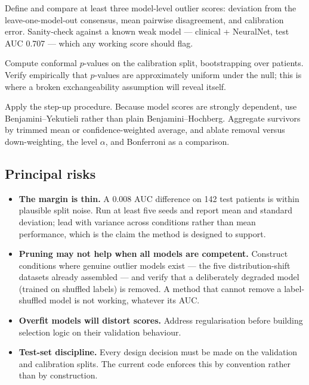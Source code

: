 \documentclass[11pt,a4paper]{article}
\begin{document}
\begin{description}[leftmargin=2.2cm,style=nextline]
  \item[Weeks 5--6] Define and compare at least three model-level outlier
    scores: deviation from the leave-one-model-out consensus, mean pairwise
    disagreement, and calibration error. Sanity-check against a known weak
    model --- clinical + NeuralNet, test AUC 0.707 --- which any working score
    should flag.
  \item[Weeks 6--7] Compute conformal $p$-values on the calibration split,
    bootstrapping over patients. Verify empirically that $p$-values are
    approximately uniform under the null; this is where a broken
    exchangeability assumption will reveal itself.
  \item[Weeks 7--8] Apply the step-up procedure. Because model scores are
    strongly dependent, use Benjamini--Yekutieli rather than plain
    Benjamini--Hochberg. Aggregate survivors by trimmed mean or
    confidence-weighted average, and ablate removal versus down-weighting,
    the level $\alpha$, and Bonferroni as a comparison.
\end{description}

\subsection{Principal risks}

\begin{itemize}
  \item \textbf{The margin is thin.} A 0.008 AUC difference on 142 test patients
        is within plausible split noise. Run at least five seeds and report mean
        and standard deviation; lead with variance across conditions rather than
        mean performance, which is the claim the method is designed to support.
  \item \textbf{Pruning may not help when all models are competent.} Construct
        conditions where genuine outlier models exist --- the five
        distribution-shift datasets already assembled --- and verify that a
        deliberately degraded model (trained on shuffled labels) is removed. A
        method that cannot remove a label-shuffled model is not working,
        whatever its AUC.
  \item \textbf{Overfit models will distort scores.} Address regularisation
        before building selection logic on their validation behaviour.
  \item \textbf{Test-set discipline.} Every design decision must be made on the
        validation and calibration splits. The current code enforces this by
        convention rather than by construction.
\end{itemize}
\end{document}
